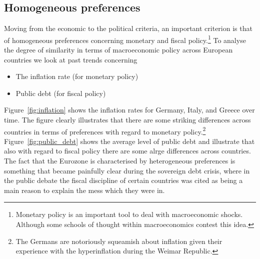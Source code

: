 \documentclass{tufte-handout}
\begin{document}
\subsection{Homogeneous preferences}
Moving from the economic to the political criteria, an important criterion is that of homogeneous preferences concerning monetary and fiscal policy.\footnote{Monetary policy is an important tool to deal with macroeconomic shocks. Although some schools of thought within macroeconomics contest this idea.}  
To analyse the degree of similarity in terms of macroeconomic policy across European countries we look at past trends concerning
\begin{itemize}
  \item The inflation rate (for monetary policy)
  \item Public debt (for fiscal policy)
\end{itemize}
Figure~\ref{fig:inflation} shows the inflation rates for Germany, Italy, and Greece over time. 
The figure clearly illustrates that there are some striking differences across countries in terms of preferences with regard to monetary policy.\footnote{The Germans are notoriously squeamish about inflation given their experience with the hyperinflation during the Weimar Republic.} 
Figure~\ref{fig:public_debt} shows the average level of public debt and illustrate that also with regard to fiscal policy there are some alrge differences across countries. 
The fact that the Eurozone is characterised by heterogeneous preferences is something that became painfully clear during the sovereign debt crisis, where in the public debate the fiscal discipline of certain countries was cited as being a main reason to explain the mess which they were in. 
\end{document}
